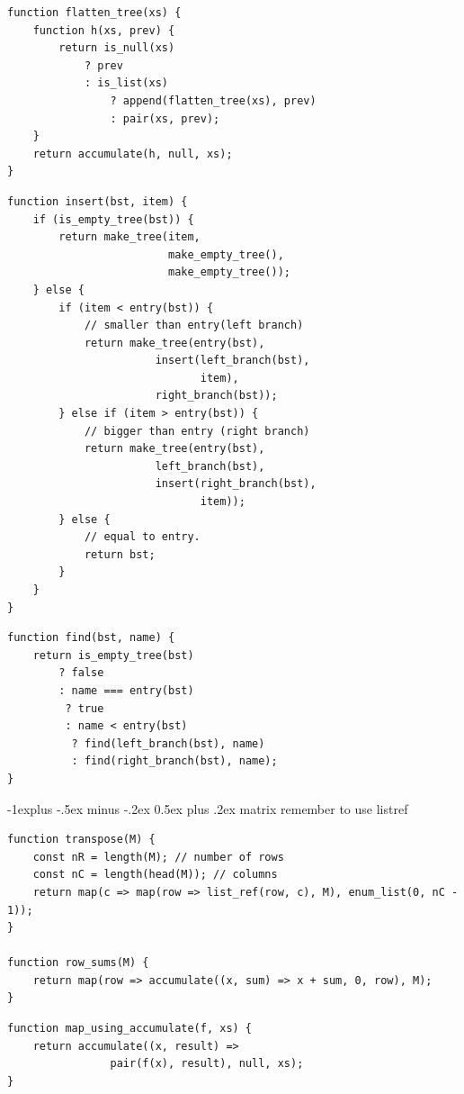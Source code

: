 \documentclass[10pt, landscape]{article}
\makeatletter
\renewcommand{\subsection}{\@startsection{subsection}{2}{0mm}%
                                {-1explus -.5ex minus -.2ex}%
                                {0.5ex plus .2ex}%
                                {\normalfont\normalsize\bfseries}}
\makeatother
\begin{document}
\begin{multicols}{4}
\begin{verbatim}
function flatten_tree(xs) {
    function h(xs, prev) {
        return is_null(xs)
            ? prev
            : is_list(xs)
                ? append(flatten_tree(xs), prev)
                : pair(xs, prev);
    }
    return accumulate(h, null, xs);
}
\end{verbatim}
\begin{verbatim}
function insert(bst, item) {
    if (is_empty_tree(bst)) {
        return make_tree(item, 
                         make_empty_tree(), 
                         make_empty_tree());
    } else {
        if (item < entry(bst)) {
            // smaller than entry(left branch)
            return make_tree(entry(bst),
                       insert(left_branch(bst),
                              item),
                       right_branch(bst));
        } else if (item > entry(bst)) {
            // bigger than entry (right branch)
            return make_tree(entry(bst),
                       left_branch(bst),
                       insert(right_branch(bst),
                              item));
        } else {
            // equal to entry.
            return bst;
        }
    }
}
\end{verbatim}
\begin{verbatim}
function find(bst, name) {
    return is_empty_tree(bst)
        ? false
        : name === entry(bst)
         ? true
         : name < entry(bst)
          ? find(left_branch(bst), name)
          : find(right_branch(bst), name);
}
\end{verbatim}

\subsection{matrix}
remember to use listref
\begin{verbatim}
function transpose(M) {
    const nR = length(M); // number of rows
    const nC = length(head(M)); // columns
    return map(c => map(row => list_ref(row, c), M), enum_list(0, nC - 1));
}

function row_sums(M) {
    return map(row => accumulate((x, sum) => x + sum, 0, row), M);
}
\end{verbatim}

\begin{verbatim}
function map_using_accumulate(f, xs) {
    return accumulate((x, result) => 
                pair(f(x), result), null, xs);
}


\end{verbatim}
\end{multicols}
\end{document}
